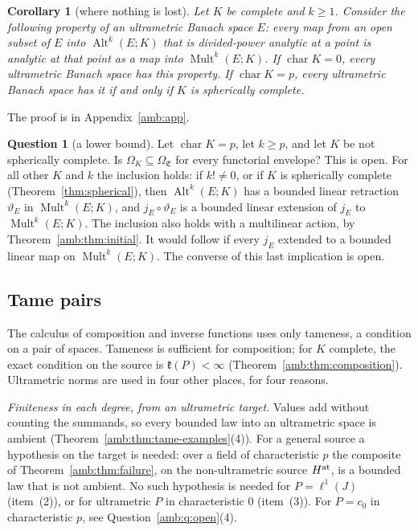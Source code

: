 \documentclass[11pt]{amsart}
\newtheorem{corollary}[theorem]{Corollary}
\theoremstyle{definition}
\theoremstyle{remark}
\numberwithin{equation}{section}
\newcommand{\Alt}{\operatorname{Alt}}
\newcommand{\Mult}{\operatorname{Mult}}
\theoremstyle{plain}
\theoremstyle{definition}
\newtheorem{question}[theorem]{Question}
\theoremstyle{plain}
\begin{document}
\begin{corollary}[where nothing is lost]\label{amb:cor:nothing-lost}
Let $K$ be complete and $k\ge1$. Consider the following property of an ultrametric Banach space $E$: every map from an open subset of $E$ into $\Alt^k(E;K)$ that is divided-power analytic at a point is analytic at that point as a map into $\Mult^k(E;K)$. If $\operatorname{char}K=0$, every ultrametric Banach space has this property. If $\operatorname{char}K=p$, every ultrametric Banach space has it if and only if $K$ is spherically complete.
\end{corollary}
The proof is in Appendix~\ref{amb:app}.

\begin{question}[a lower bound]\label{amb:q:lower-bound}
Let $\operatorname{char}K=p$, let $k\ge p$, and let $K$ be not spherically complete. Is $\Omega_K\subseteq\Omega_{\mathfrak E}$ for every functorial envelope? This is open. For all other $K$ and $k$ the inclusion holds: if $k!\ne0$, or if $K$ is spherically complete (Theorem~\ref{thm:spherical}), then $\Alt^k(E;K)$ has a bounded linear retraction $\vartheta_E$ in $\Mult^k(E;K)$, and $j_E\circ\vartheta_E$ is a bounded linear extension of $j_E$ to $\Mult^k(E;K)$. The inclusion also holds with a multilinear action, by Theorem~\ref{amb:thm:initial}. It would follow if every $j_E$ extended to a bounded linear map on $\Mult^k(E;K)$. The converse of this last implication is open.
\end{question}

\subsection{Tame pairs}\label{amb:ssec:tame}

The calculus of composition and inverse functions uses only tameness, a condition on a pair of spaces. Tameness is sufficient for composition; for $K$ complete, the exact condition on the source is $\mathfrak k(P)<\infty$ (Theorem~\ref{amb:thm:composition}). Ultrametric norms are used in four other places, for four reasons.

\emph{Finiteness in each degree, from an ultrametric target.} Values add without counting the summands, so every bounded law into an ultrametric space is ambient (Theorem~\ref{amb:thm:tame-examples}(4)). For a general source a hypothesis on the target is needed: over a field of characteristic $p$ the composite of Theorem~\ref{amb:thm:failure}, on the non-ultrametric source $H^{\rm at}$, is a bounded law that is not ambient. No such hypothesis is needed for $P=\ell^1(J)$ (item~(2)), or for ultrametric $P$ in characteristic $0$ (item~(3)). For $P=c_0$ in characteristic $p$, see Question~\ref{amb:q:open}(4).
\end{document}
